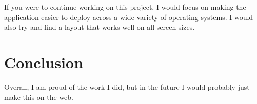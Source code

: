 \documentclass[10pt]{article}
\begin{document}
If you were to continue working on this project, I would focus on making the application easier to deploy across a wide variety of operating systems. I would also try and find a layout that works well on all screen sizes.

\section{Conclusion}

Overall, I am proud of the work I did, but in the future I would probably just make this on the web.

\newpage
\singlespacing
\thispagestyle{empty}
\listoffigures 
\newpage

\newpage
\nocite{*}


\end{document}
